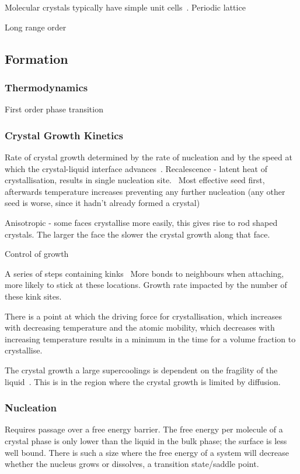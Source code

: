 Molecular crystals typically have simple unit cells~\cite{brock:94}. Periodic lattice

Long range order
\subsection{Formation}
\subsubsection{Thermodynamics}
First order phase transition

\subsubsection{Crystal Growth Kinetics}
Rate of crystal growth determined by the rate of nucleation and by the speed at which the crystal-liquid interface advances~\cite{turnbull:69}.
Recalescence - latent heat of crystallisation, results in single nucleation site.~\cite{turnbull:69} Most effective seed first, afterwards temperature increases preventing any further nucleation (any other seed is worse, since it hadn't already formed a crystal)

Anisotropic - some faces crystallise more easily, this gives rise to rod shaped crystals.
The larger the face the slower the crystal growth along that face.

Control of growth~\cite{de-yoreo:03}

A series of steps containing kinks~\cite{chernov:61} More bonds to neighbours when attaching, more likely to stick at these locations. Growth rate impacted by the number of these kink sites.

There is a point at which the driving force for crystallisation, which increases with decreasing temperature and the atomic mobility, which decreases with increasing temperature results in a minimum in the time for a volume fraction to crystallise.~\cite{uhlmann:72}
\begin{figure}
\end{figure}

The crystal growth a large supercoolings is dependent on the fragility of the liquid~\cite{ediger:08}. This is in the region where the crystal growth is limited by diffusion. 


\subsubsection{Nucleation}
Requires passage over a free energy barrier. The free energy per molecule of a crystal phase is only lower than the liquid in the bulk phase; the surface is less well bound. There is such a size where the free energy of a system will decrease whether the nucleus grows or dissolves, a transition state/saddle point.

